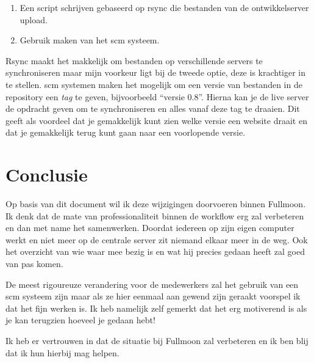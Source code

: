 \documentclass[12pt,a4paper]{article}
\begin{document}
    \begin{enumerate}
      \item Een script schrijven gebaseerd op {\sc rsync} die bestanden van de ontwikkelserver upload.
      \item Gebruik maken van het {\sc scm} systeem.
    \end{enumerate}
    
    Rsync maakt het makkelijk om bestanden op verschillende servers te synchroniseren maar mijn voorkeur ligt bij de tweede optie, deze is krachtiger in te stellen.
    {\sc scm} systemen maken het mogelijk om een versie van bestanden in de repository een \emph{tag} te geven, bijvoorbeeld ``versie 0.8''. Hierna kan je de live server de opdracht geven om te synchroniseren en alles vanaf deze tag te draaien. Dit geeft als voordeel dat je gemakkelijk kunt zien welke versie een website draait en dat je gemakkelijk terug kunt gaan naar een voorlopende versie.
    
  \section{Conclusie}
  
  Op basis van dit document wil ik deze wijzigingen doorvoeren binnen Fullmoon. Ik denk dat de mate van professionaliteit binnen de workflow erg zal verbeteren en dan met name het samenwerken. Doordat iedereen op zijn eigen computer werkt en niet meer op de centrale server zit niemand elkaar meer in de weg. Ook het overzicht van wie waar mee bezig is en wat hij precies gedaan heeft zal goed van pas komen.

  De meest rigoureuze verandering voor de medewerkers zal het gebruik van een {\sc scm} systeem zijn maar als ze hier eenmaal aan gewend zijn geraakt voorspel ik dat het fijn werken is. Ik heb namelijk zelf gemerkt dat het erg motiverend is als je kan terugzien hoeveel je gedaan hebt!
  
  Ik heb er vertrouwen in dat de situatie bij Fullmoon zal verbeteren en ik ben blij dat ik hun hierbij mag helpen.
\end{document}
